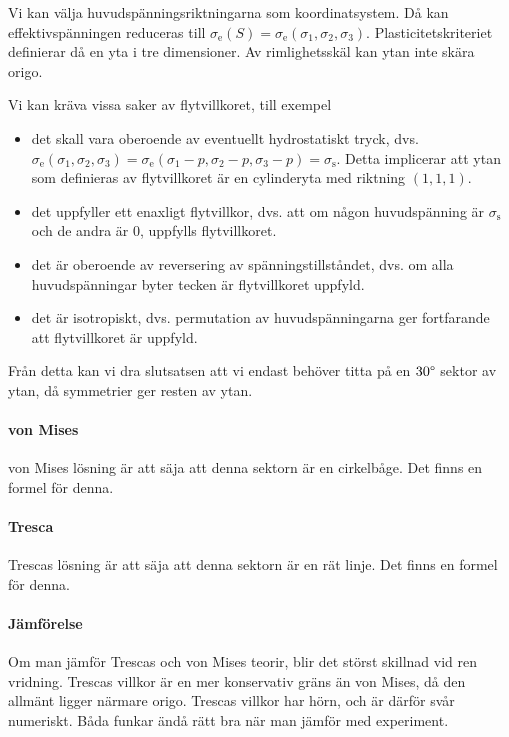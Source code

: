 Vi kan välja huvudspänningsriktningarna som koordinatsystem. Då kan effektivspänningen reduceras till $\sigma_{\text{e}}(S) = \sigma_{\text{e}}(\sigma_{1}, \sigma_{2}, \sigma_{3})$. Plasticitetskriteriet definierar då en yta i tre dimensioner. Av rimlighetsskäl kan ytan inte skära origo.

Vi kan kräva vissa saker av flytvillkoret, till exempel
\begin{itemize}
	\item det skall vara oberoende av eventuellt hydrostatiskt tryck, dvs. $\sigma_{\text{e}}(\sigma_{1}, \sigma_{2}, \sigma_{3}) = \sigma_{\text{e}}(\sigma_{1} - p, \sigma_{2}- p, \sigma_{3}- p) = \sigma_{\text{s}}$. Detta implicerar att ytan som definieras av flytvillkoret är en cylinderyta med riktning $(1, 1, 1)$.
	\item det uppfyller ett enaxligt flytvillkor, dvs. att om någon huvudspänning är $\sigma_{\text{s}}$ och de andra är $0$, uppfylls flytvillkoret.
	\item det är oberoende av reversering av spänningstillståndet, dvs. om alla huvudspänningar byter tecken är flytvillkoret uppfyld.
	\item det är isotropiskt, dvs. permutation av huvudspänningarna ger fortfarande att flytvillkoret är uppfyld.
\end{itemize}
Från detta kan vi dra slutsatsen att vi endast behöver titta på en $30\degree$ sektor av ytan, då symmetrier ger resten av ytan.

\paragraph{von Mises}
von Mises lösning är att säja att denna sektorn är en cirkelbåge. Det finns en formel för denna.

\paragraph{Tresca}
Trescas lösning är att säja att denna sektorn är en rät linje. Det finns en formel för denna.

\paragraph{Jämförelse}
Om man jämför Trescas och von Mises teorir, blir det störst skillnad vid ren vridning. Trescas villkor är en mer konservativ gräns än von Mises, då den allmänt ligger närmare origo. Trescas villkor har hörn, och är därför svår numeriskt. Båda funkar ändå rätt bra när man jämför med experiment.

